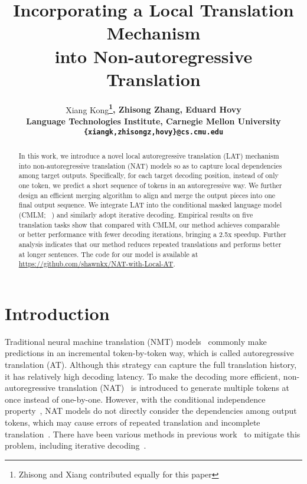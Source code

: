 \documentclass[11pt,a4paper]{article}
\title{Incorporating a Local Translation Mechanism \\into Non-autoregressive Translation}
\author{
	Xiang Kong\bf{\thanks{\quad Zhisong and Xiang contributed equally for this paper}}, Zhisong Zhang\footnotemark[1], Eduard Hovy\\
	Language Technologies Institute, Carnegie Mellon University\\
	\texttt{\{xiangk,zhisongz,hovy\}@cs.cmu.edu}
}
\date{}
\begin{document}
\maketitle
\begin{abstract}

In this work, we introduce a novel local autoregressive translation (LAT) mechanism into non-autoregressive translation (NAT) models so as to capture local dependencies among target outputs. Specifically, for each target decoding position, instead of only one token, we predict a short sequence of tokens in an autoregressive way. We further design an efficient merging algorithm to align and merge the output pieces into one final output sequence. We integrate LAT into the conditional masked language model (CMLM; ~\citealp{ghazvininejad-etal-2019-mask}) and similarly adopt iterative decoding. Empirical results on five translation tasks show that compared with CMLM, our method achieves  comparable or better performance with fewer decoding iterations, bringing a 2.5x speedup. Further analysis indicates that our method reduces repeated translations and performs better at longer sentences. The code for our
model is available at \url{https://github.com/shawnkx/NAT-with-Local-AT}.
\end{abstract}

\section{Introduction}
\label{sec:intro2}

Traditional neural machine translation (NMT) models~\cite{sutskever2014sequence,cho2014learning,bahdanau2014neural,gehring2017convolutional,vaswani2017attention} commonly make predictions in an incremental token-by-token way, which is called autoregressive translation (AT).
Although this strategy can capture the full translation history, it has relatively high decoding latency.
To make the decoding more efficient, non-autoregressive translation (NAT)~\cite{gu2017non} is introduced to generate multiple tokens at once instead of one-by-one. 
However, with the conditional independence property~\cite{gu2017non}, NAT models do not directly consider the dependencies among output tokens, which may cause errors of repeated translation and incomplete translation~\cite{wang2019non}. 
There have been various methods in previous work~\cite{stern2019insertion,NIPS2019_9297,ma-etal-2018-bag,wei2019imitation,ma2019flowseq,tu2020engine} to mitigate this problem, including iterative decoding~\cite{lee2018deterministic,ghazvininejad-etal-2019-mask}. 
\end{document}
